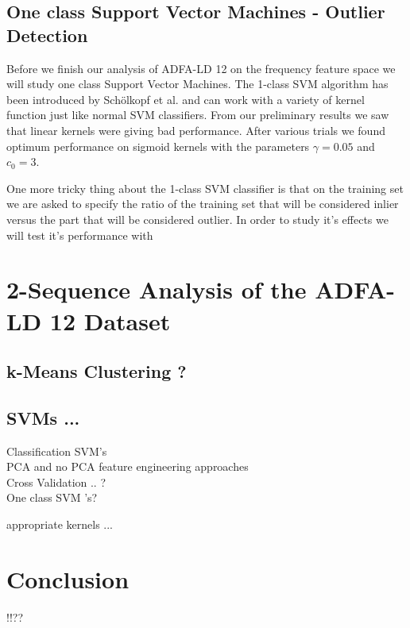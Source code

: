 \documentclass[reqno,openany,12pt]{amsbook}
\begin{document}
\section{ One class Support Vector Machines - Outlier Detection}

Before we finish our analysis of ADFA-LD 12 on the frequency feature space we will study one class Support Vector Machines. The 1-class SVM algorithm has been introduced by Schölkopf et al.\cite{out4} and can work with a variety of kernel function just like normal SVM classifiers. From our preliminary results we saw that linear kernels were giving bad performance. After various trials we found optimum performance on sigmoid kernels with the parameters $\gamma = 0.05$ and $c_0 = 3$. 

One more tricky thing about the 1-class SVM classifier is that on the training set we are asked to specify the ratio of the training set that will be considered inlier versus the part that will be considered outlier. In order to study it's effects we will test it's performance with 


\chapter{2-Sequence Analysis of the ADFA-LD 12 Dataset}

\section{k-Means Clustering ?}

\section{SVMs ...}

Classification SVM's\\
PCA and no PCA feature engineering approaches\\
Cross Validation .. ?\\

One class SVM 's?

appropriate kernels ...

\chapter{Conclusion}


 !!?? 
 
\end{document}

